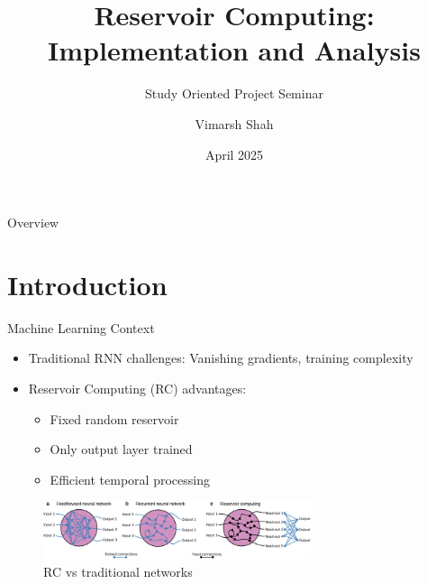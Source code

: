 \documentclass{beamer}
\title{Reservoir Computing: Implementation and Analysis}
\subtitle{Study Oriented Project Seminar}
\author{Vimarsh Shah}
\institute{BITS Pilani, Goa}
\date{April 2025}
\begin{document}
\begin{frame}
  \titlepage
\end{frame}

\begin{frame}{Overview}
  \tableofcontents
\end{frame}

\section{Introduction}
\begin{frame}{Machine Learning Context}
  \begin{itemize}
    \item Traditional RNN challenges: Vanishing gradients, training complexity
    \item Reservoir Computing (RC) advantages:
    \begin{itemize}
      \item Fixed random reservoir
      \item Only output layer trained
      \item Efficient temporal processing
    \end{itemize}
  \end{itemize}
  \begin{figure}
    \includegraphics[width=0.7\textwidth]{figures/rc_difference_with others.png}
    \caption{RC vs traditional networks}
  \end{figure}
\end{frame}
\end{document}
